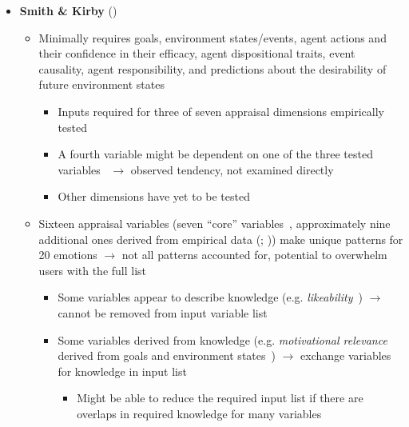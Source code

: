 \begin{itemize}
    \item \textbf{Smith \& Kirby} (\good)
    \begin{itemize}
        \item Minimally requires goals, environment states/events, agent
        actions and their confidence in their efficacy, agent dispositional
        traits, event causality, agent responsibility, and predictions about
        the desirability of future environment states
        \begin{itemize}
            \item Inputs required for three of seven appraisal dimensions
            empirically tested~\citep[p.~1357, 1361--1362,
            1367]{smith2009putting}

            \item A fourth variable might be dependent on one of the three
            tested variables~\citep[p.~138]{smith2001toward} $\rightarrow$
            observed tendency, not examined directly

            \item Other dimensions have yet to be
            tested~\citep[p.~1369]{smith2009putting}
        \end{itemize}

        \item Sixteen appraisal variables (seven ``core''
        variables~\citep[p.~123]{smith2001toward}, approximately nine
        additional ones derived from empirical data
        (; )) make unique
        patterns for 20 emotions $\rightarrow$ not all patterns accounted for,
        potential to overwhelm users with the full list
        \begin{itemize}
            \item Some variables appear to describe knowledge (e.g.
            \textit{likeability}~\citep{yih2016distinct}) $\rightarrow$ cannot
            be removed from input variable list

            \item Some variables derived from knowledge (e.g.
            \textit{motivational relevance} derived from goals and environment
            states~\citep[p.~1361]{smith2009putting}) $\rightarrow$ exchange
            variables for knowledge in input list
            \begin{itemize}
                \item Might be able to reduce the required input list if there
                are overlaps in required knowledge for many variables


\end{itemize}
\end{itemize}
\end{itemize}
\end{itemize}
